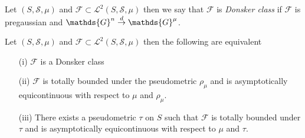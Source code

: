 \begin{defn}Let $(S,\mathcal{S}, \mu)$ and $\mathcal{F} \subset \mathcal{L}^2(S, \mathcal{S}, \mu)$ then we say that $\mathcal{F}$ is \emph{Donsker class} if $\mathcal{F}$ is pregaussian and $\mathds{G}^n \todist \mathds{G}^\mu$.
\end{defn}

\begin{thm}\label{DonskerClassesAndAsymptoticEquicontinuity}Let $(S,\mathcal{S}, \mu)$ and $\mathcal{F} \subset \mathcal{L}^2(S, \mathcal{S}, \mu)$ then the following are equivalent
\begin{itemize}
\item[(i)] $\mathcal{F}$ is a Donsker class
\item[(ii)] $\mathcal{F}$ is totally bounded under the pseudometric $\rho_\mu$ and is asymptotically equicontinuous with respect to $\mu$ and $\rho_\mu$.
\item[(iii)] There exists a pseudometric $\tau$ on $S$ such that $\mathcal{F}$ is totally bounded under $\tau$ and is asymptotically equicontinuous with respect to $\mu$ and $\tau$.
\end{itemize}
\end{thm}
